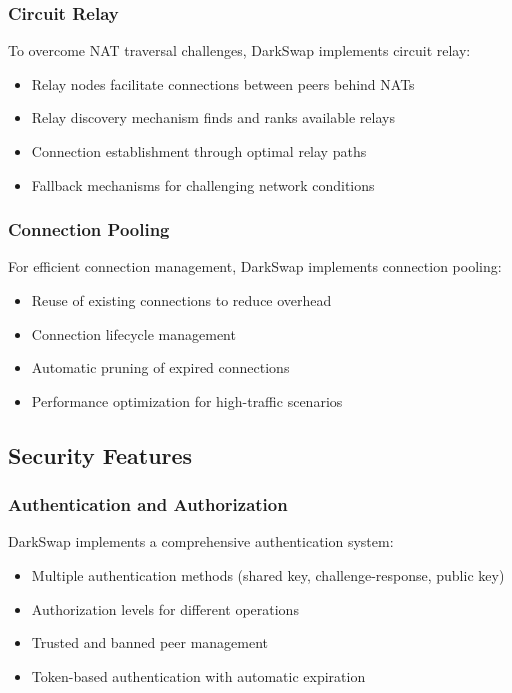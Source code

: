 \documentclass[11pt,a4paper]{article}
\begin{document}
\subsubsection{Circuit Relay}

To overcome NAT traversal challenges, DarkSwap implements circuit relay:

\begin{itemize}
    \item Relay nodes facilitate connections between peers behind NATs
    \item Relay discovery mechanism finds and ranks available relays
    \item Connection establishment through optimal relay paths
    \item Fallback mechanisms for challenging network conditions
\end{itemize}

\subsubsection{Connection Pooling}

For efficient connection management, DarkSwap implements connection pooling:

\begin{itemize}
    \item Reuse of existing connections to reduce overhead
    \item Connection lifecycle management
    \item Automatic pruning of expired connections
    \item Performance optimization for high-traffic scenarios
\end{itemize}

\subsection{Security Features}

\subsubsection{Authentication and Authorization}

DarkSwap implements a comprehensive authentication system:

\begin{itemize}
    \item Multiple authentication methods (shared key, challenge-response, public key)
    \item Authorization levels for different operations
    \item Trusted and banned peer management
    \item Token-based authentication with automatic expiration
\end{itemize}
\end{document}
